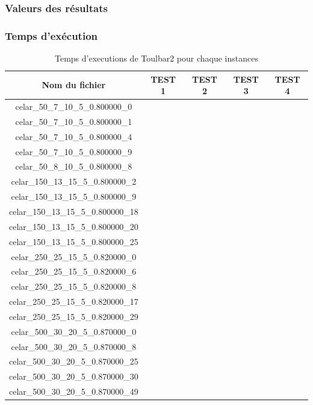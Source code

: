 \documentclass[a4paper, 10pt]{article}
\begin{document}
      \subsubsection{Valeurs des résultats}

      \subsubsection{Temps d'exécution}
      \begin{table}[ht]
        \centering
        \begin{tabular}{| c | c | c| c| c |}
          \hline
          \textbf{Nom du fichier} & \textbf{TEST 1} & \textbf{TEST 2} & \textbf{TEST 3} & \textbf{TEST 4} \\
          \hline
          celar\_50\_7\_10\_5\_0.800000\_0 &  &  &  &  \\
          \hline
          celar\_50\_7\_10\_5\_0.800000\_1 &  &  &  &  \\
          \hline
          celar\_50\_7\_10\_5\_0.800000\_4 &  &  &  &  \\
          \hline
          celar\_50\_7\_10\_5\_0.800000\_9 &  &  &  &  \\
          \hline
          celar\_50\_8\_10\_5\_0.800000\_8 &  &  &  &  \\
          \hline
          celar\_150\_13\_15\_5\_0.800000\_2 &  &  &  &  \\
          \hline
          celar\_150\_13\_15\_5\_0.800000\_9 &  &  &  &  \\
          \hline
          celar\_150\_13\_15\_5\_0.800000\_18 &  &  &  &  \\
          \hline
          celar\_150\_13\_15\_5\_0.800000\_20 &  &  &  &  \\
          \hline
          celar\_150\_13\_15\_5\_0.800000\_25 &  &  &  &  \\
          \hline
          celar\_250\_25\_15\_5\_0.820000\_0 &  &  &  &  \\
          \hline
          celar\_250\_25\_15\_5\_0.820000\_6 &  &  &  &  \\
          \hline
          celar\_250\_25\_15\_5\_0.820000\_8 &  &  &  &  \\
          \hline
          celar\_250\_25\_15\_5\_0.820000\_17 &  &  &  &  \\
          \hline
          celar\_250\_25\_15\_5\_0.820000\_29 &  &  &  &  \\
          \hline
          celar\_500\_30\_20\_5\_0.870000\_0 &  &  &  &  \\
          \hline
          celar\_500\_30\_20\_5\_0.870000\_8 &  &  &  &  \\
          \hline
          celar\_500\_30\_20\_5\_0.870000\_25 &  &  &  &  \\
          \hline
          celar\_500\_30\_20\_5\_0.870000\_30 &  &  &  &  \\
          \hline
          celar\_500\_30\_20\_5\_0.870000\_49 &  &  &  &  \\
          \hline
        \end{tabular}
        \caption{Temps d'executions de Toulbar2 pour chaque instances}
      \end{table}
\end{document}
